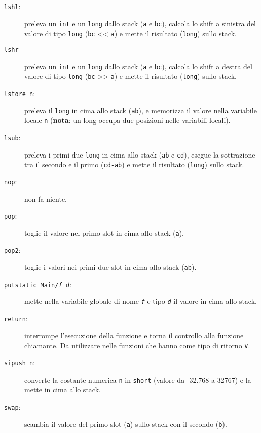 \begin{description}
  \item[\texttt{lshl}:] preleva un \texttt{int} e un \texttt{long} dallo stack (\texttt{a} e \texttt{bc}), calcola lo shift a sinistra del valore di tipo \texttt{long} (\texttt{bc} << \texttt{a}) e mette il risultato (\texttt{long}) sullo stack.

  \item[\texttt{lshr}] preleva un \texttt{int} e un \texttt{long} dallo stack (\texttt{a} e \texttt{bc}), calcola lo shift a destra del valore di tipo \texttt{long} (\texttt{bc} >> \texttt{a}) e mette il risultato (\texttt{long}) sullo stack.

  \item[\texttt{lstore n}:] preleva il \texttt{long} in cima allo stack (\texttt{ab}), e memorizza il valore nella variabile locale \texttt{n} (\textbf{nota}: un long occupa due posizioni nelle variabili locali).

  \item[\texttt{lsub}:] preleva i primi due \texttt{long} in cima allo stack (\texttt{ab} e \texttt{cd}), esegue la sottrazione tra il secondo e il primo (\texttt{cd-ab}) e mette il risultato (\texttt{long}) sullo stack.

  \item[\texttt{nop}:] non fa niente.

  \item[\texttt{pop}:] toglie il valore nel primo slot in cima allo stack (\texttt{a}).

  \item[\texttt{pop2}:] toglie i valori nei primi due slot in cima allo stack (\texttt{ab}).

  \item[\texttt{putstatic Main/\textit{f} \textit{d}}:] mette nella variabile globale di nome \texttt{\textit{f}} e tipo \texttt{\textit{d}} il valore in cima allo stack.

  \item[\texttt{return}:] interrompe l'esecuzione della funzione e torna il controllo alla funzione chiamante. Da utilizzare nelle funzioni che hanno come tipo di ritorno \texttt{V}.

  \item[\texttt{sipush n}:] converte la costante numerica \texttt{n} in \texttt{short} (valore da -32.768 a 32767) e la mette in cima allo stack.

  \item[\texttt{swap}:] scambia il valore del primo slot (\texttt{a}) sullo stack con il secondo (\texttt{b}).
\end{description}


